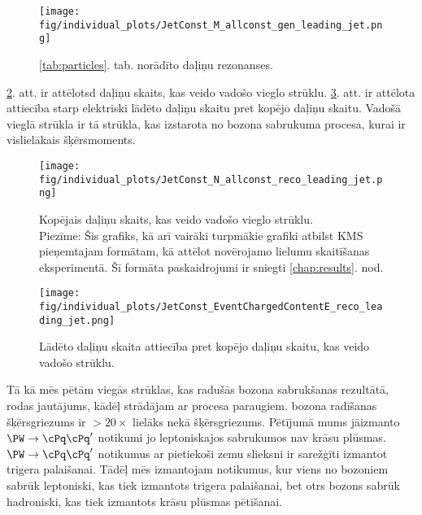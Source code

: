   \begin{figure}[hbtp]
    \centering
    \texttt{[image: fig/individual\_plots/JetConst\_M\_allconst\_gen\_leading\_jet.png]}
    \caption{\protect\ref{tab:particles}. tab. norādīto daļiņu rezonanses.}
    \label{fig:mass_resonances}
  \end{figure}

\ref{fig:number}. att. ir attēlotsd daļiņu skaits, kas veido vadošo vieglo strūklu. \ref{fig:charged_content}. att. ir attēlota attiecība starp elektriski lādēto daļiņu skaitu pret kopējo daļiņu skaitu. Vadošā vieglā strūkla ir tā strūkla, kas izstarota no \PW bozona sabrukuma procesa, kurai ir vislielākais šķērsmoments.

  \begin{figure}[hbtp]
    \centering
    \texttt{[image: fig/individual\_plots/JetConst\_N\_allconst\_reco\_leading\_jet.png]}
    \caption{Kopējais daļiņu skaits, kas veido vadošo vieglo strūklu. \\
    \footnotesize Piezīme: Šis grafiks, kā arī vairāki turpmākie grafiki atbilst KMS pieņemtajam formātam, kā attēlot novērojamo lielumu skaitīšanas eksperimentā. Šī formāta paskaidrojumi ir sniegti \protect\ref{chap:results}. nod.}
    \label{fig:number}

\end{figure}
     \begin{figure}[hbtp]
     \centering
     \texttt{[image: fig/individual\_plots/JetConst\_EventChargedContentE\_reco\_leading\_jet.png]}
     \caption{Lādēto daļiņu skaita attiecība pret kopējo daļiņu skaitu, kas veido vadošo strūklu.}
  \label{fig:charged_content}
   \end{figure}

Tā kā mēs pētām viegās strūklas, kas radušās \PW bozona sabrukšanas rezultātā, rodas jautājums, kādēļ strādājam ar \ttbar procesa paraugiem. \PW bozona radīšanas šķērsgriezums ir $>20\times$ lielāks nekā \ttbar šķērsgriezums. Pētījumā mums jāizmanto $\PW\rightarrow \cPq\cPq'$ notikumi jo leptoniskajos sabrukumos nav krāsu plūsmas. $\PW\rightarrow \cPq\cPq'$ notikumus ar pietiekoši zemu \pt slieksni ir sarežģīti izmantot trigera palaišanai. Tādēļ mēs izmantojam \ttbar notikumus, kur viens no \PW bozoniem sabrūk leptoniski, kas tiek izmantots trigera palaišanai, bet otrs \PW bozons sabrūk hadroniski, kas tiek izmantots krāsu plūsmas pētīšanai.

